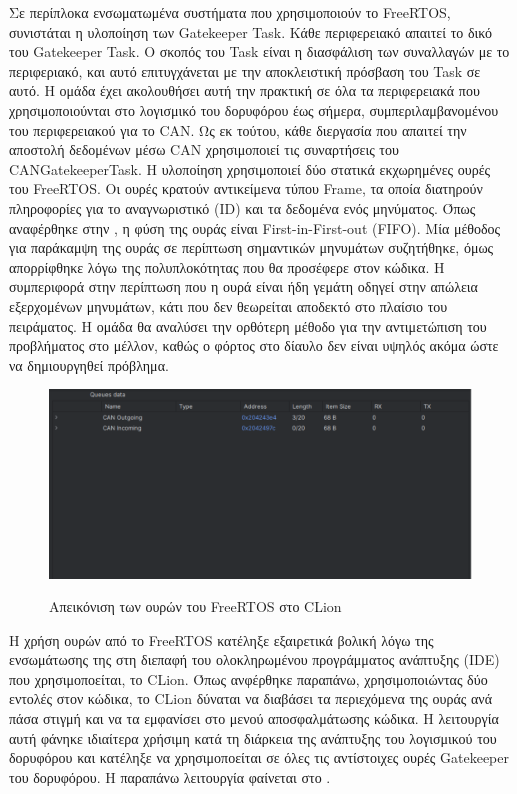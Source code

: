 \documentclass[a4paper,nobib,justified]{tufte-book}
\begin{document}
Σε περίπλοκα ενσωματωμένα συστήματα που χρησιμοποιούν το FreeRTOS, συνιστάται η υλοποίηση των Gatekeeper Task. Κάθε περιφερειακό απαιτεί το δικό του Gatekeeper Task. Ο σκοπός του Task είναι η διασφάλιση των συναλλαγών με το περιφεριακό, και αυτό επιτυγχάνεται με την αποκλειστική πρόσβαση του Task σε αυτό.  Η ομάδα έχει ακολουθήσει αυτή την πρακτική σε όλα τα περιφερειακά που χρησιμοποιούνται στο λογισμικό του δορυφόρου έως σήμερα, συμπεριλαμβανομένου του περιφερειακού για το CAN. Ως εκ τούτου, κάθε διεργασία που απαιτεί την αποστολή δεδομένων μέσω CAN χρησιμοποιεί τις συναρτήσεις του CANGatekeeperTask. Η υλοποίηση χρησιμοποιεί δύο στατικά εκχωρημένες ουρές του FreeRTOS. Οι ουρές κρατούν αντικείμενα τύπου Frame, τα οποία διατηρούν πληροφορίες για το αναγνωριστικό (ID) και τα δεδομένα ενός μηνύματος. Όπως αναφέρθηκε στην , η φύση της ουράς είναι First-in-First-out (FIFO). Μία μέθοδος για παράκαμψη της ουράς σε περίπτωση σημαντικών μηνυμάτων συζητήθηκε, όμως απορρίφθηκε λόγω της πολυπλοκότητας που θα προσέφερε στον κώδικα. Η συμπεριφορά στην περίπτωση που η ουρά είναι ήδη γεμάτη οδηγεί στην απώλεια εξερχομένων μηνυμάτων, κάτι που δεν θεωρείται αποδεκτό στο πλαίσιο του πειράματος. Η ομάδα θα αναλύσει την ορθότερη μέθοδο για την αντιμετώπιση του προβλήματος στο μέλλον, καθώς ο φόρτος στο δίαυλο δεν είναι υψηλός ακόμα ώστε να δημιουργηθεί πρόβλημα.

\begin{figure}
	\centering
	\includegraphics[width=0.9\linewidth]{media/images/clion-queues.pdf}
	\label{fig:clion-queues}
	\caption[Απεικόνιση των ουρών του FreeRTOS στο CLion]{Απεικόνιση των ουρών του FreeRTOS στο CLion}
\end{figure}

\par Η χρήση ουρών από το FreeRTOS κατέληξε εξαιρετικά βολική λόγω της ενσωμάτωσης της στη διεπαφή του ολοκληρωμένου προγράμματος ανάπτυξης (IDE) που χρησιμοποείται, το CLion. Όπως ανφέρθηκε παραπάνω, χρησιμοποιώντας δύο εντολές στον κώδικα, το CLion δύναται να διαβάσει τα περιεχόμενα της ουράς ανά πάσα στιγμή και να τα εμφανίσει στο μενού αποσφαλμάτωσης κώδικα. Η λειτουργία αυτή φάνηκε ιδιαίτερα χρήσιμη κατά τη διάρκεια της ανάπτυξης του λογισμικού του δορυφόρου και κατέληξε να χρησιμοποείται σε όλες τις αντίστοιχες ουρές Gatekeeper του δορυφόρου. Η παραπάνω λειτουργία φαίνεται στο .
\end{document}
